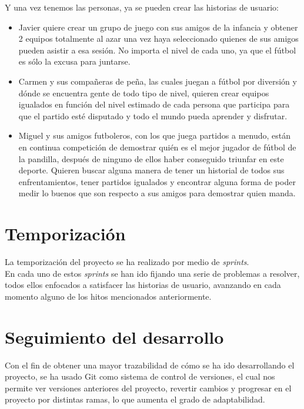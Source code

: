 Y una vez tenemos las personas, ya se pueden crear las historias de usuario:

\begin{itemize}
    \item Javier quiere crear un grupo de juego con sus amigos de la infancia y obtener 2 equipos totalmente al azar una vez haya seleccionado quienes de sus amigos pueden asistir a esa sesión. No importa el nivel de cada uno, ya que el fútbol es sólo la excusa para juntarse.
    \item Carmen y sus compañeras de peña, las cuales juegan a fútbol por diversión y dónde se encuentra gente de todo tipo de nivel, quieren crear equipos igualados en función del nivel estimado de cada persona que participa para que el partido esté disputado y todo el mundo pueda aprender y disfrutar.
    \item Miguel y sus amigos futboleros, con los que juega partidos a menudo, están en continua competición de demostrar quién es el mejor jugador de fútbol de la pandilla, después de ninguno de ellos haber conseguido triunfar en este deporte. Quieren buscar alguna manera de tener un historial de todos sus enfrentamientos, tener partidos igualados y encontrar alguna forma de poder medir lo buenos que son respecto a sus amigos para demostrar quien manda.
\end{itemize}

\newpage
\section{Temporización}

La temporización del proyecto se ha realizado por medio de \textit{sprints}.\\

En cada uno de estos \textit{sprints} se han ido fijando una serie de problemas a resolver, todos ellos enfocados a satisfacer las historias de usuario, avanzando en cada momento
alguno de los hitos mencionados anteriormente.


\section{Seguimiento del desarrollo}

Con el fin de obtener una mayor trazabilidad de cómo se ha ido desarrollando el proyecto, se ha usado Git como sistema de control de versiones, el cual nos permite ver versiones anteriores
del proyecto, revertir cambios y progresar en el proyecto por distintas ramas, lo que aumenta el grado de adaptabilidad.\\

